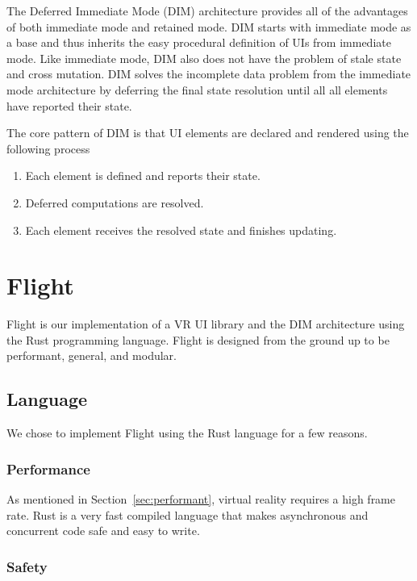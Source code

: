 \documentclass[conference,12pt]{IEEEtran}
\begin{document}
The Deferred Immediate Mode (DIM) architecture provides all of the advantages of
both immediate mode and retained mode. DIM starts with immediate mode as a base
and thus inherits the easy procedural definition of UIs from immediate mode.
Like immediate mode, DIM also does not have the problem of stale state and cross
mutation.  DIM solves the incomplete data problem from the immediate mode
architecture by deferring the final state resolution until all all elements have
reported their state.

The core pattern of DIM is that UI elements are declared and rendered using the
following process
\begin{enumerate}
    \item Each element is defined and reports their state.
    \item Deferred computations are resolved.
    \item Each element receives the resolved state and finishes updating.
\end{enumerate}


\section{Flight}\label{sec:flight}

Flight is our implementation of a VR UI library and the DIM architecture using
the Rust programming language. Flight is designed from the ground up to be
performant, general, and modular.

\subsection{Language}

We chose to implement Flight using the Rust language for a few reasons.

\subsubsection{Performance}

As mentioned in Section~\ref{sec:performant}, virtual reality requires a high
frame rate. Rust is a very fast compiled language that makes asynchronous and
concurrent code safe and easy to write.

\subsubsection{Safety}
\end{document}
